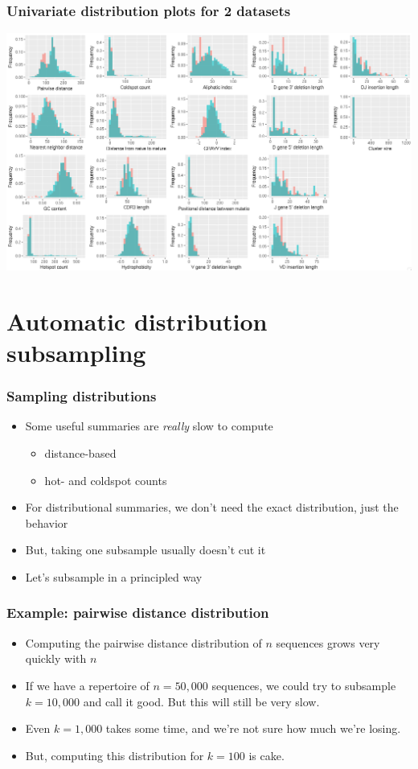 \documentclass[mathserif,compress]{beamer}
\renewcommand\;{\,}
\begin{document}
\begin{frame}\frametitle{Univariate distribution plots for 2 datasets}
\begin{center}
\includegraphics[width=\linewidth]{Images/Dual_summaries.png}
\end{center}
\end{frame}

\section{Automatic distribution subsampling}

\begin{frame}\frametitle{Sampling distributions}
\begin{itemize}
\item Some useful summaries are \emph{really} slow to compute
\begin{itemize}
\item distance-based
\medskip
\item hot- and coldspot counts
\end{itemize}
\bigskip
\item For distributional summaries, we don't need the exact distribution, just the behavior
\bigskip
\item
But, taking one subsample usually doesn't cut it
\bigskip
\item Let's subsample in a principled way
\end{itemize}
\end{frame}

\begin{frame}\frametitle{Example: pairwise distance distribution}
\begin{itemize}
\item
Computing the pairwise distance distribution of $n$ sequences grows very quickly with $n$
\bigskip
\item
If we have a repertoire of $n = 50,000$ sequences, we could try to subsample $k = 10,000$ and call it good. But this will still be very slow. 
\item
Even $k = 1,000$ takes some time, and we're not sure how much we're losing.

\bigskip
\item But, computing this distribution for $k = 100$ is cake. 
\end{itemize}
\end{frame}
\end{document}
